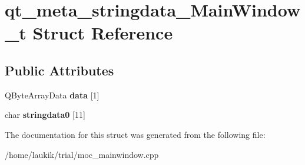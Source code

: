 \hypertarget{structqt__meta__stringdata__MainWindow__t}{}\section{qt\+\_\+meta\+\_\+stringdata\+\_\+\+Main\+Window\+\_\+t Struct Reference}
\label{structqt__meta__stringdata__MainWindow__t}
\subsection*{Public Attributes}
\begin{DoxyCompactItemize}
\item 
\mbox{\label{structqt__meta__stringdata__MainWindow__t_a0ae2a8bf39f0690707c6a48ca1585d31}} 
Q\+Byte\+Array\+Data {\bfseries data} \mbox{[}1\mbox{]}
\item 
\mbox{\label{structqt__meta__stringdata__MainWindow__t_a9779ce86858769bbae7d2cb0c461d77c}} 
char {\bfseries stringdata0} \mbox{[}11\mbox{]}
\end{DoxyCompactItemize}


The documentation for this struct was generated from the following file\+:\begin{DoxyCompactItemize}
\item 
/home/laukik/trial/moc\+\_\+mainwindow.\+cpp\end{DoxyCompactItemize}
